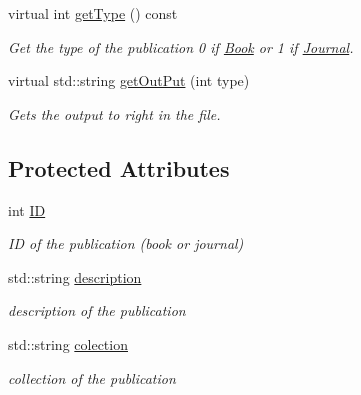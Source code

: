 \begin{DoxyCompactItemize}
virtual int \hyperlink{class_publication_ab0bd9119b29b09fbbe9044016a512407}{get\+Type} () const
\begin{DoxyCompactList}\small\item\em Get the type of the publication 0 if \hyperlink{class_book}{Book} or 1 if \hyperlink{class_journal}{Journal}. \end{DoxyCompactList}\item 
virtual std\+::string \hyperlink{class_publication_af382f9557807e8375478ceb7890e841f}{get\+Out\+Put} (int type)
\begin{DoxyCompactList}\small\item\em Gets the output to right in the file. \end{DoxyCompactList}\end{DoxyCompactItemize}
\subsection*{Protected Attributes}
\begin{DoxyCompactItemize}
\item 
\mbox{\label{class_publication_a5bb18d963c10a67fcc6da7b895a3474a}} 
int \hyperlink{class_publication_a5bb18d963c10a67fcc6da7b895a3474a}{ID}
\begin{DoxyCompactList}\small\item\em ID of the publication (book or journal) \end{DoxyCompactList}\item 
\mbox{\label{class_publication_abfcf695658989bad9371a7896213f9a6}} 
std\+::string \hyperlink{class_publication_abfcf695658989bad9371a7896213f9a6}{description}
\begin{DoxyCompactList}\small\item\em description of the publication \end{DoxyCompactList}\item 
\mbox{\label{class_publication_a644dc37a95f7da3bc8b83ca601383368}} 
std\+::string \hyperlink{class_publication_a644dc37a95f7da3bc8b83ca601383368}{colection}
\begin{DoxyCompactList}\small\item\em collection of the publication \end{DoxyCompactList}\end{DoxyCompactItemize}


